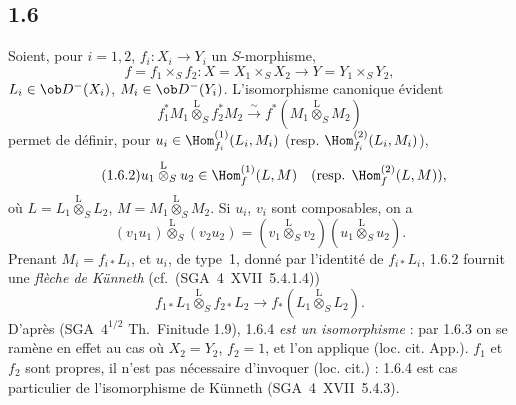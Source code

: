 \subsection*{1.6}
Soient, pour $i=1,2$, $f_i:X_i\to Y_i$ un $S$-morphisme,
\[
f=f_1\times_S f_2:X=X_1\times_S X_2\to Y=Y_1\times_S Y_2,
\]
$L_i\in\ob D^{-}(X_i)$, $M_i\in\ob D^{-}(Y_i)$. L'isomorphisme canonique évident
\begin{equation}\tag{1.6.1}
f_1^{*}M_1\overset{\mathrm{L}}{\otimes}_{S}f_2^{*}M_2\xrightarrow{\sim}f^{*}(M_1\overset{\mathrm{L}}{\otimes}_{S}M_2)
\end{equation}
permet de définir, pour $u_i\in\Hom_{f_i}^{(1)}(L_i,M_i)$ (resp. $\Hom_{f_i}^{(2)}(L_i,M_i)$),
\begin{equation}\tag{1.6.2}
u_1\overset{\mathrm{L}}{\otimes}_{S}u_2\in\Hom_{f}^{(1)}(L,M)\quad(\text{resp. }\Hom_f^{(2)}(L,M)),
\end{equation}
où $L=L_1\overset{\mathrm{L}}{\otimes}_{S}L_2$, $M=M_1\overset{\mathrm{L}}{\otimes}_{S}M_2$. Si $u_i$, $v_i$ sont composables, on a
\begin{equation}\tag{1.6.3}
(v_1u_1)\overset{\mathrm{L}}{\otimes}_{S}(v_2u_2)=(v_1\overset{\mathrm{L}}{\otimes}_{S}v_2)(u_1\overset{\mathrm{L}}{\otimes}_{S}u_2).
\end{equation}
Prenant $M_i=f_{i*}L_i$, et $u_i$, de type~1, donné par l'identité de $f_{i*}L_i$, 1.6.2 fournit une \emph{flèche de Künneth} (cf.~(SGA~4~XVII~5.4.1.4))
\begin{equation}\tag{1.6.4}
f_{1*}L_1\overset{\mathrm{L}}{\otimes}_{S}f_{2*}L_2\longrightarrow f_{*}(L_1\overset{\mathrm{L}}{\otimes}_{S}L_2).
\end{equation}
D'après (SGA~$4^{1/2}$ Th.~Finitude 1.9), 1.6.4 \emph{est un isomorphisme} : par 1.6.3 on se ramène en effet au cas où $X_2=Y_2$, $f_2=1$, et l'on applique (loc. cit. App.).  $f_1$ et $f_2$ sont propres, il n'est pas nécessaire d'invoquer (loc. cit.) : 1.6.4 est cas particulier de l'isomorphisme de Künneth (SGA~4~XVII~5.4.3).

